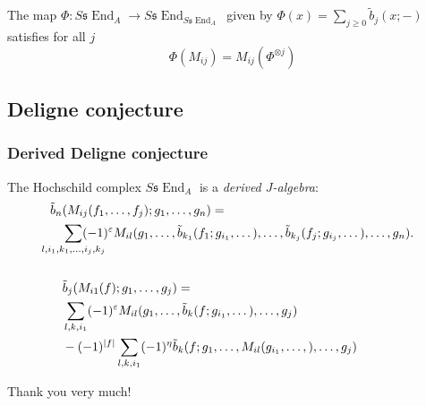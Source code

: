\documentclass{beamer}
\theoremstyle{definition}
\newcommand{\s}{\mathfrak{s}}
\DeclareMathOperator{\End}{End}
\begin{document}
\begin{frame}
\begin{corollary}
The map $\Phi:S\s\End_A\to S\s\End_{S\s\End_A}$ given by $\Phi(x)= \sum_{j\geq 0} \tilde{b}_j(x;-)$ satisfies for all $j$
\[\Phi(M_{ij}) = M_{ij}(\Phi^{\otimes j})\]
\end{corollary}
\end{frame}

\subsection{Deligne conjecture}
\begin{frame}
\frametitle{Derived Deligne conjecture}
\begin{theorem} %
The Hochschild complex $S\s\End_A$ is a \emph{derived $J$-algebra}:
\begin{align*}
\tilde{b}_n&(M_{ij}(f_1,\dots, f_j);g_1,\dots, g_n)=\\
&\sum_{\mathclap{l,i_1,k_1,\dots, i_j,k_j}}(-1)^{\varepsilon}M_{il}(g_1,\dots, \tilde{b}_{k_1}(f_1;g_{i_1},\dots),\dots, \tilde{b}_{k_j}(f_j;g_{i_j},\dots),\dots, g_n).\\ 
\\
&\tilde{b}_j(M_{i1}(f);g_1,\dots, g_j)=\\
&\sum_{l,k,i_1}(-1)^{\varepsilon}M_{il}(g_1,\dots, \tilde{b}_{k}(f;g_{i_1},\dots),\dots, g_j)\\
&-(-1)^{|f|}\sum_{l,k,i_1} (-1)^{\eta} \tilde{b}_k(f;g_1,\dots, M_{il}(g_{i_1},\dots,), \dots, g_j)
\end{align*}
\end{theorem}
\end{frame}



\begin{frame}
\begin{center}
\Huge{Thank you very much!}
\end{center}
\end{frame}
\end{document}
